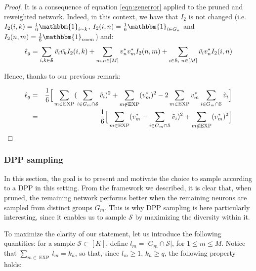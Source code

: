 \begin{proof}
    It is a consequence of equation \ref{eqn:generror} applied to the pruned and reweighted network. Indeed, in this context, we have that $I_2$ is not changed (i.e. $I_2(i,k) = \frac{1}{6} \mathbbm{1}_{i \sim k}$, $I_2(i,n) = \frac{1}{6} \mathbbm{1}_{i \in G_n}$ and $I_2(n,m) = \frac{1}{6} \mathbbm{1}_{n=m}$) and:
    \begin{equation*}
     \hat{\epsilon}_g = \sum \limits_{i , k \in \mathcal{S}} \Tilde{v_i}\Tilde{v_k} I_2(i,k) + \sum \limits_{m , n \in [M]} v_n^*v_m^* I_2(n,m) +\sum \limits_{i \in \mathcal{S} \text{, } n \in [M]} \Tilde{v_i} v_n^* I_2(i,n)
     \end{equation*}

    Hence, thanks to our previous remark:

    \begin{eqnarray*}
     \hat{\epsilon}_g 
     &=  &\dfrac{1}{6}\Big [\sum \limits_{m \in \operatorname{ EXP }} (\sum \limits_{i \in G_m \cap \mathcal{S}}\Tilde{v}_i)^2 + \sum \limits_{m \notin \operatorname{ EXP 
 }} (v_m^*)^2 - 2 \sum \limits_{m \in \operatorname{ EXP }} v_m^* \sum \limits_{i \in G_m \cap \mathcal{S}} \Tilde{v}_i \Big ] \\
     &=  &\dfrac{1}{6} \Big [\sum \limits_{m \in \operatorname{ EXP }}(v_m^* - \sum \limits_{i \in G_m \cap \mathcal{S}}\Tilde{v}_i)^2 + \sum \limits_{m \notin \operatorname{ EXP }} (v_m^*)^2 \Big ]
     \end{eqnarray*}
\end{proof}


\subsubsection{DPP sampling}

In this section, the goal is to present and motivate the choice to sample  according to a DPP in this setting. From the framework we described, it is clear that, when pruned, the remaining network performs better when the remaining neurons are sampled from distinct groups $G_m$. This is why DPP sampling is here particularly interesting, since it enables us to sample $\mathcal{S}$ by maximizing the diversity within it.

To maximize the clarity of our statement, let us introduce the following quantities: for a sample $\mathcal{S} \subset [K]$, define $l_m = \lvert G_m \cap \mathcal{S} \rvert$, for $1 \leq m \leq M$. Notice that $\sum \limits _{m \in \operatorname{EXP}} l_m = k_n$, so that, since $l_m \geq 1$, $k_n \geq q$, the following property holds:

